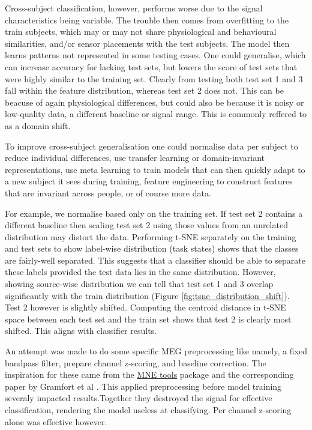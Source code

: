 \documentclass[conference]{IEEEtran}
\begin{document}
Cross-subject classification, however, performs worse due to the signal characteristics being variable. The trouble then comes from overfitting to the train subjects, which may or may not share physiological and behavioural similarities, and/or sensor placements with the test subjects. The model then learns patterns not represented in some testing cases. One could generalise, which can increase accuracy for lacking test sets, but lowers the score of test sets that were highly similar to the training set. Clearly from testing both test set 1 and 3 fall within the feature distribution, whereas test set 2 does not. This can be beacuse of again physiological differences, but could also be because it is noisy or low-quality data, a different baseline or signal range. This is commonly reffered to as a domain shift.

To improve cross-subject generalisation one could normalise data per subject to reduce individual differences, use transfer learning or domain-invariant representations, use meta learning to train models that can then quickly adapt to a new subject it sees during training, feature engineering to construct features that are invariant across people, or of course more data.

For example, we normalise based only on the training set. If test set 2 contains a different baseline then scaling test set 2 using those values from an unrelated distribution may distort the data. Performing t-SNE separately on the training and test sets to show label-wise distribution (task states) shows that the classes are fairly-well separated. This suggests that a classifier should be able to separate these labels provided the test data lies in the same distribution. However, showing source-wise distribution we can tell that test set 1 and 3 overlap significantly with the train distribution (Figure \ref{fig:tsne_distribution_shift}). Test 2 however is slightly shifted. Computing the centroid distance in t-SNE space between each test set and the train set shows that test 2 is clearly most shifted. This aligns with classifier results.

\label{discussion}
An attempt was made to do some specific MEG preprocessing like namely, a fixed bandpass filter, prepare channel z-scoring, and baseline correction. The inspiration for these came from the \href{https://mne.tools/stable/index.html}{MNE tools} package and the corresponding paper by Gramfort et al \cite{gramfort2013meg}. This applied preprocessing before model training severaly impacted results.Together they destroyed the signal for effective classification, rendering the model useless at classifying. Per channel z-scoring alone was effective however. 
\end{document}
